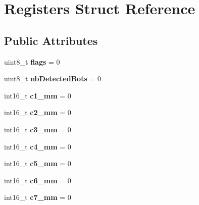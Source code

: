 \hypertarget{structRegisters}{}\section{Registers Struct Reference}
\label{structRegisters}
\subsection*{Public Attributes}
\begin{DoxyCompactItemize}
\item 
\mbox{\label{structRegisters_af7c5e585624ad3d5fa6d6a3e256b5c62}} 
uint8\+\_\+t {\bfseries flags} = 0
\item 
\mbox{\label{structRegisters_a727b39142b196ee0de4762f6d8cf548b}} 
uint8\+\_\+t {\bfseries nb\+Detected\+Bots} = 0
\item 
\mbox{\label{structRegisters_aca4532de6b1abf1e7fe6e77dfaf821aa}} 
int16\+\_\+t {\bfseries c1\+\_\+mm} = 0
\item 
\mbox{\label{structRegisters_a565108d577746a7db330ec972c4603bc}} 
int16\+\_\+t {\bfseries c2\+\_\+mm} = 0
\item 
\mbox{\label{structRegisters_a6b9064a6eb6ac3fcdaf7448e4b946e78}} 
int16\+\_\+t {\bfseries c3\+\_\+mm} = 0
\item 
\mbox{\label{structRegisters_a7f712c1fd4e57850e7cee3d976ecb046}} 
int16\+\_\+t {\bfseries c4\+\_\+mm} = 0
\item 
\mbox{\label{structRegisters_a362bc2e26c2ee6a3f2173c13e4915509}} 
int16\+\_\+t {\bfseries c5\+\_\+mm} = 0
\item 
\mbox{\label{structRegisters_a431d1369c14c0c407cb2a6826cb1a43d}} 
int16\+\_\+t {\bfseries c6\+\_\+mm} = 0
\item 
\mbox{\label{structRegisters_a25c8f90c35e95d49917828dcc522f95e}} 
int16\+\_\+t {\bfseries c7\+\_\+mm} = 0
\item 
\mbox{\label{structRegisters_a8d18455e12e6ff358329845e9062b30a}} 

\end{DoxyCompactItemize}
